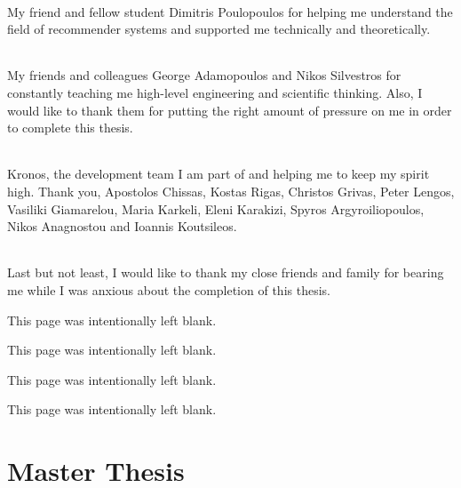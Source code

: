 \documentclass[12pt, a4paper, oneside, greek]{report}
\begin{document}
\paragraph{} My friend and fellow student Dimitris Poulopoulos for helping me understand the field of recommender systems and supported me technically and theoretically.

\paragraph{} My friends and colleagues George Adamopoulos and Nikos Silvestros for constantly teaching me high-level engineering and scientific thinking. Also, I would like to thank them for putting the right amount of pressure on me in order to complete this thesis.

\paragraph{} Kronos, the development team I am part of and helping me to keep my spirit high. Thank you, Apostolos Chissas, Kostas Rigas, Christos Grivas, Peter Lengos, Vasiliki Giamarelou, Maria Karkeli, Eleni Karakizi, Spyros Argyroiliopoulos, Nikos Anagnostou and Ioannis Koutsileos. 

\paragraph{} Last but not least, I would like to thank my close friends and family for bearing me while I was anxious about the completion of this thesis.

\newpage
\begin{center}
	This page was intentionally left blank.
\end{center}
\newpage
\tableofcontents
\newpage
\begin{center}
	This page was intentionally left blank.
\end{center}
\newpage
\listoftables
\newpage
\begin{center}
	This page was intentionally left blank.
\end{center}
\newpage
\listoffigures
\newpage

\begin{center}
This page was intentionally left blank.
\end{center}
\newpage
{}
\part{Master Thesis}





\newpage



\end{document}

